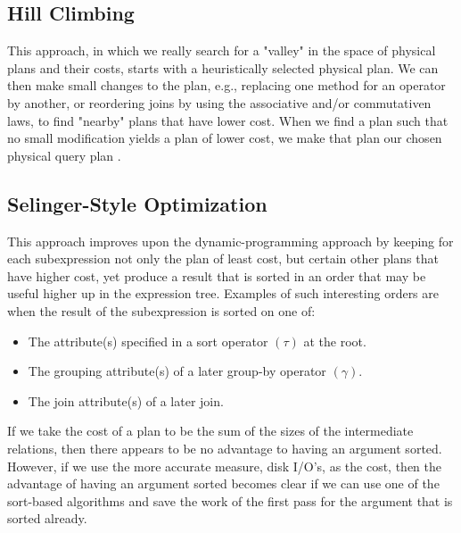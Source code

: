 \subsection{Hill Climbing}
This approach, in which we really search for a "valley" in the space of physical plans and their costs, starts with a heuristically selected physical plan. We can then make small changes to the plan, e.g., replacing one method for an operator by another, or reordering joins by using the associative and/or commutativen laws, to find "nearby" plans that have lower cost. When we find a plan such that no small modification yields a plan of lower cost, we make that plan our chosen physical query plan .

\subsection{Selinger-Style Optimization}
This approach improves upon the dynamic-programming approach by keeping for each subexpression not only the plan of least cost, but certain other plans that have higher cost, yet produce a result that is sorted in an order that may be useful higher up in the expression tree. Examples of such interesting orders are when the result of the subexpression is sorted on one of:
\begin{itemize}
    \item The attribute(s) specified in a sort operator $(\tau)$ at the root.
    \item The grouping attribute(s) of a later group-by operator $(\gamma)$.
    \item The join attribute(s) of a later join. 
\end{itemize}
If we take the cost of a plan to be the sum of the sizes of the intermediate relations, then there appears to be no advantage to having an argument sorted. However, if we use the more accurate measure, disk I/O's, as the cost, then the advantage of having an argument sorted becomes clear if we can use one of the sort-based algorithms and save the work of the first pass for the argument that is sorted already.

